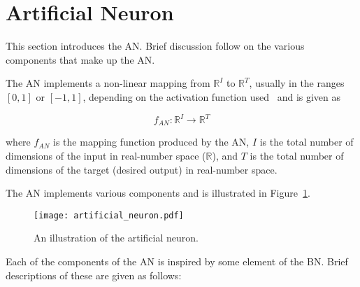 \section{Artificial Neuron}\label{sec:anns:an}

This section introduces the \acs{AN}. Brief discussion follow on the various components that make up the \acs{AN}.

The \acs{AN} implements a non-linear mapping from $\mathbb{R}^{I}$ to
$\mathbb{R}^{T}$, usually in the ranges $[0,1]$ or $[-1,1]$, depending on the
activation function used~\cite{ref:engelbrecht:2007} and is given
as

\begin{equation}
      f_{AN} \colon \mathbb{R}^{I} \to \mathbb{R}^{T}
      \label{eq:an_function_mapping}
\end{equation}

where $f_{AN}$ is the mapping function produced by the \acs{AN}, $I$ is the total number of dimensions of the input in real-number space ($\mathbb{R}$), and $T$ is the total number of dimensions of the target (desired output) in real-number space.

The \acs{AN} implements various components and is illustrated in Figure~\ref{fig:artificial_neuron}.

\begin{figure}[htb]
      \centering
      \texttt{[image: artificial\_neuron.pdf]}
      \caption[The artificial neuron]{An illustration of the artificial neuron.}
      \label{fig:artificial_neuron}
\end{figure}

Each of the components of the \acs{AN} is inspired by some element of the \acs{BN}. Brief descriptions of these are given as follows:

